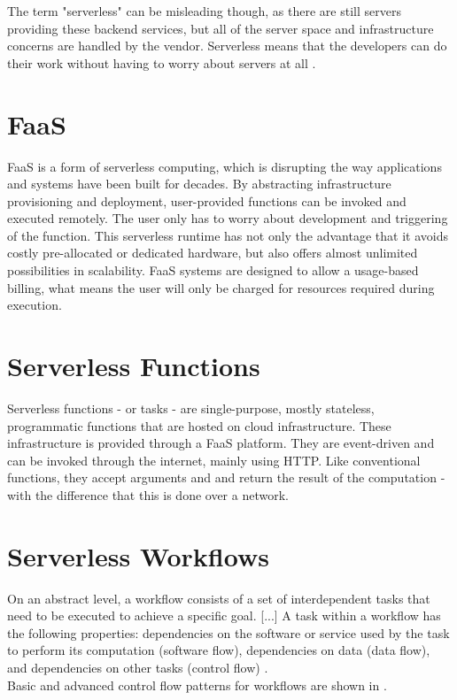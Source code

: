\documentclass[a4paper,top=25mm,bottom=25mm,12pt,pdftex,halfparskip,twoside,bibtotoc,numbers=noenddot]{scrbook}
\begin{document}
The term "serverless" can be misleading though, as there are still servers providing these backend services, but all of the server space and infrastructure concerns are handled by the vendor. Serverless means that the developers can do their work without having to worry about servers at all \cite{online-what-is-serverless-cloudflare}.

\section{FaaS}

FaaS is a form of serverless computing, which is disrupting the way applications and systems have been built for decades. By abstracting infrastructure provisioning and deployment, user-provided functions can be invoked and executed remotely. The user only has to worry about development and triggering of the function. This serverless runtime has not only the advantage that it avoids costly pre-allocated or dedicated hardware, but also offers almost unlimited possibilities in scalability. FaaS systems are designed to allow a usage-based billing, what means the user will only be charged for resources required during execution.

\section{Serverless Functions}
Serverless functions - or tasks - are single-purpose, mostly stateless, programmatic functions that are hosted on cloud infrastructure. These infrastructure is provided through a FaaS platform. They are event-driven and can be invoked through the internet, mainly using HTTP. Like conventional functions, they accept arguments and and return the result of the computation  - with the difference that this is done over a network.

\section{Serverless Workflows}
On an abstract level, a workflow consists of a set of interdependent tasks that need to be executed to achieve a specific goal. [...] A task within a workflow has the following properties: dependencies on the software or service used by the task to perform its computation (software flow), dependencies on data (data flow), and dependencies on other tasks (control flow) \cite{thesis-design-serverless-worfklow-system-eyk}.\\
Basic and advanced control flow patterns for workflows are shown in \cite{reports-workflow-control-patterns-russell}.
\end{document}
